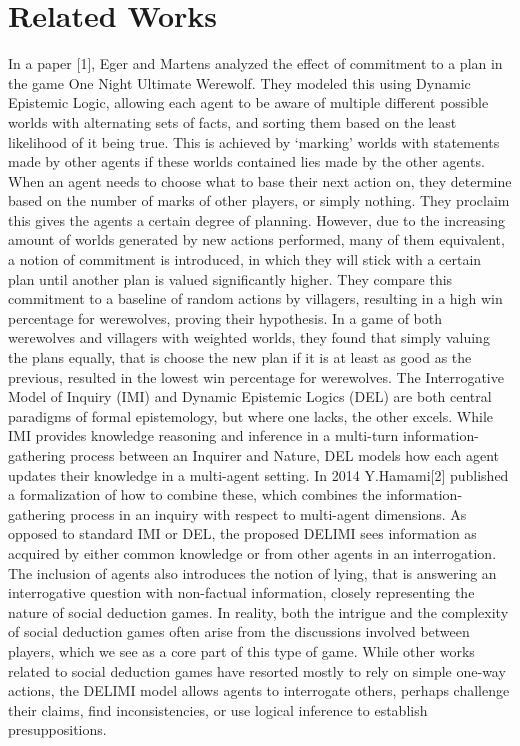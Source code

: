 \section{Related Works}
In a paper [1], Eger and Martens analyzed the effect of commitment to a plan in
the game One Night Ultimate Werewolf. They modeled this using Dynamic Epistemic
Logic, allowing each agent to be aware of multiple different possible worlds
with alternating sets of facts, and sorting them based on the least likelihood
of it being true. This is achieved by ‘marking’ worlds with statements made by
other agents if these worlds contained lies made by the other agents. When an
agent needs to choose what to base their next action on, they determine based
on the number of marks of other players, or simply nothing. They proclaim this
gives the agents a certain degree of planning. However, due to the increasing
amount of worlds generated by new actions performed, many of them equivalent, a
notion of commitment is introduced, in which they will stick with a certain
plan until another plan is valued significantly higher. They compare this
commitment to a baseline of random actions by villagers, resulting in a high
win percentage for werewolves, proving their hypothesis. In a game of both
werewolves and villagers with weighted worlds, they found that simply valuing
the plans equally, that is choose the new plan if it is at least as good as the
previous, resulted in the lowest win percentage for werewolves. The
Interrogative Model of Inquiry (IMI) and Dynamic Epistemic Logics (DEL) are
both central paradigms of formal epistemology, but where one lacks, the other
excels. While IMI provides knowledge reasoning and inference in a multi-turn
information-gathering process between an Inquirer and Nature, DEL models how
each agent updates their knowledge in a multi-agent setting. In 2014
Y.Hamami[2] published a formalization of how to combine these, which combines
the information-gathering process in an inquiry with respect to multi-agent
dimensions. As opposed to standard IMI or DEL, the proposed DELIMI sees
information as acquired by either common knowledge or from other agents in an
interrogation. The inclusion of agents also introduces the notion of lying,
that is answering an interrogative question with non-factual information,
closely representing the nature of social deduction games. In reality, both the
intrigue and the complexity of social deduction games often arise from the
discussions involved between players, which we see as a core part of this type
of game. While other works related to social deduction games have resorted
mostly to rely on simple one-way actions, the DELIMI model allows agents to
interrogate others, perhaps challenge their claims, find inconsistencies, or
use logical inference to establish presuppositions.

